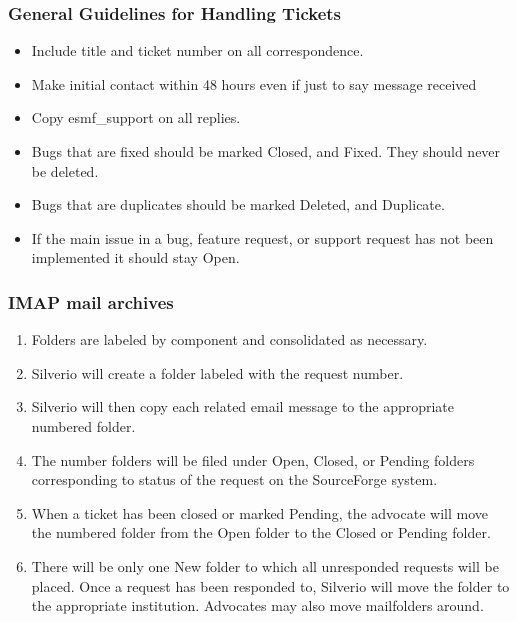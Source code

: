\subsubsection{General Guidelines for Handling Tickets}
\begin{itemize}
\item Include title and ticket number on all correspondence.
\item Make initial contact within 48 hours even if just to say message received
\item Copy esmf\_support on all replies.
\item Bugs that are fixed should be marked Closed, and Fixed. They should never be deleted. 
\item Bugs that are duplicates should be marked Deleted, and Duplicate. 
\item If the main issue in a bug, feature request, or support request has not been implemented it should stay Open.
\end{itemize}

\subsubsection{IMAP mail archives}
\begin{enumerate}
\item Folders are labeled by component and consolidated as necessary.
\item Silverio will create a folder labeled with the request number. 
\item Silverio will then copy each related email message to the appropriate 
numbered folder. 
\item The number folders will be filed under Open, Closed, or Pending folders 
corresponding to status of the request on the SourceForge system.
\item When a ticket has been closed or marked Pending, the advocate will move the numbered folder from the Open folder to the Closed or Pending folder.
\item There will be only one New folder to which all unresponded requests will be placed. Once a request has been responded to, Silverio will move the folder to the appropriate institution. Advocates may also move mailfolders around.
\end{enumerate}